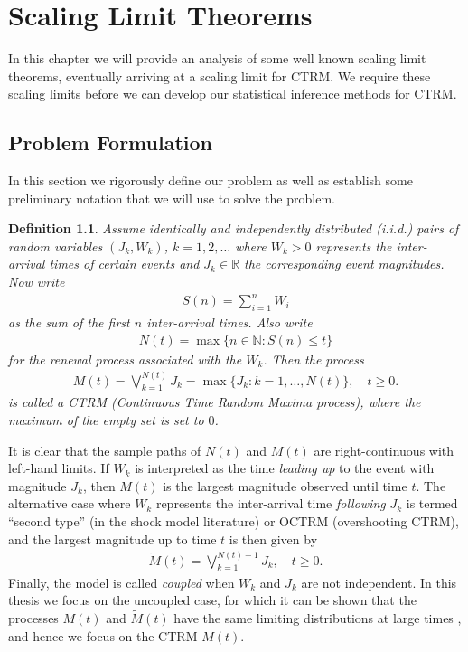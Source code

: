 \documentclass[honours,12pt]{UNSWthesis}
\newcommand{\R}{\mathbb{R}}
\newcommand{\1}{\mathbf 1}
\newtheorem{definition}[theorem]{Definition}
\numberwithin{equation}{section}
\theoremstyle{definition}
\theoremstyle{remark}
\begin{document}
\chapter{Scaling Limit Theorems}
In this chapter we will provide an analysis of some well known scaling limit theorems, eventually arriving at a scaling limit for CTRM. We require these scaling limits before we can develop our statistical inference methods for CTRM.
\section{Problem Formulation}
In this section we rigorously define our problem as well as establish some preliminary notation that we will use to solve the problem.
\begin{definition}
Assume identically and independently distributed (i.i.d.) pairs of random variables $(J_k, W_k)$, $k = 1, 2, \ldots$
where $W_k > 0$ represents the inter-arrival times of certain events and 
$J_k \in \R$ the corresponding event magnitudes. Now write
\begin{align}
	S(n)=\sum_{i=1}^n W_i
\end{align}
as the sum of the first $n$ inter-arrival times. Also write
\begin{align} \label{eq:renewal-process}
N(t) = \max\{n \in \mathbb N: S(n) \le t\}
\end{align}
for the renewal process
associated with the $W_k$.
Then the process
\begin{align}
M(t) = \bigvee_{k=1}^{N(t)} J_k
= \max\{J_k: k = 1, \ldots, N(t)\}, \quad t \ge 0.
\end{align}
is called a CTRM (Continuous Time Random Maxima process), where the maximum of the empty set is set to $0$.\\
\end{definition}

It is clear that the sample paths of $N(t)$ and $M(t)$ are right-continuous
with left-hand limits. 
If $W_k$ is interpreted as the time \emph{leading up} to the event with magnitude
$J_k$, then $M(t)$ is the largest magnitude observed until time $t$.
The alternative case where $W_k$ represents the inter-arrival time 
\textit{following} $J_k$ 
is termed ``second type'' (in the shock model literature) or OCTRM
(overshooting CTRM), and the largest magnitude up to time $t$ is then
given by
\begin{align}
\tilde M(t) = \bigvee_{k=1}^{N(t)+1} J_k, \quad t \ge 0.
\end{align}
Finally, the model is called \emph{coupled} when $W_k$ and $J_k$ are not independent.
In this thesis we focus on the uncoupled case,  
for which it can be shown that the processes $M(t)$ and
$\tilde M(t)$ have the same limiting distributions at large times
\cite{Hees2015}, and hence we focus on the CTRM $M(t)$. 
\end{document}
